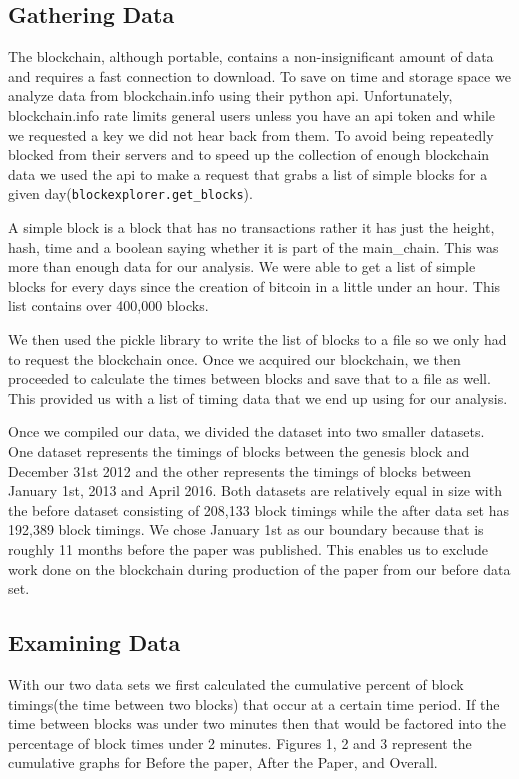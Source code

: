 \documentclass{sig-alternate-05-2015}
\begin{document}
\subsection{Gathering Data}
The blockchain, although portable, contains a non-insignificant amount of data and requires a fast connection to download. To save on time and storage space we analyze data from blockchain.info using their python api. Unfortunately, blockchain.info rate limits general users unless you have an api token and while we requested a key we did not hear back from them. To avoid being repeatedly blocked from their servers and to speed up the collection of enough blockchain data we used the api to make a request that grabs a list of simple blocks for a given day(\texttt{blockexplorer.get\_blocks}).

A simple block is a block that has no transactions rather it has just the height, hash, time and a boolean saying whether it is part of the main\_chain. This was more than enough data for our analysis. We were able to get a list of simple blocks for every days since the creation of bitcoin in a little under an hour. This list contains over 400,000 blocks. 

We then used the pickle library to write the list of blocks to a file so we only had to request the blockchain once. Once we acquired our blockchain, we then proceeded to calculate the times between blocks and save that to a file as well. This provided us with a list of timing data that we end up using for our analysis. 

Once we compiled our data, we divided the dataset into two smaller datasets. One dataset represents the timings of blocks between the genesis block and December 31st 2012 and the other represents the timings of blocks between January 1st, 2013 and April 2016. Both datasets are relatively equal in size with the before dataset consisting of 208,133 block timings while the after data set has 192,389 block timings. We chose January 1st as our boundary because that is roughly 11 months before the paper was published. This enables us to exclude work done on the blockchain during production of the paper from our before data set.


\subsection{Examining Data}
With our two data sets we first calculated the cumulative percent of block timings(the time between two blocks) that occur at a certain time period. If the time between blocks was under two minutes then that would be factored into the percentage of block times under 2 minutes. Figures 1, 2 and 3 represent the cumulative graphs for Before the paper, After the Paper, and Overall. 
\end{document}
